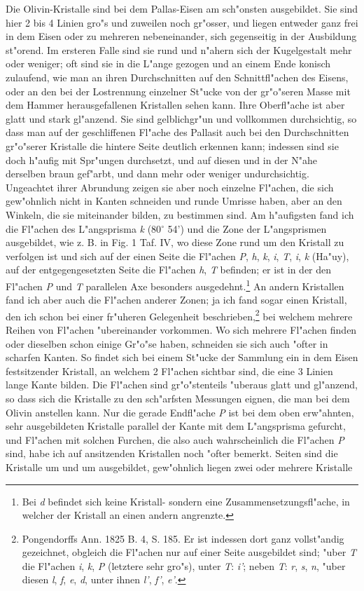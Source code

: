 \documentclass[a4paper, 11pt, oneside]{article}
\begin{document}
Die Olivin-Kristalle sind bei dem Pallas-Eisen am sch"onsten ausgebildet. Sie sind hier 2 bis 4 Linien gro"s und zuweilen noch gr"osser, und liegen entweder ganz frei in dem Eisen oder zu mehreren nebeneinander, sich gegenseitig in der Ausbildung st"orend. Im ersteren Falle sind sie rund und n"ahern sich der Kugelgestalt mehr oder weniger; oft sind sie in die L"ange gezogen und an einem Ende konisch zulaufend, wie man an ihren Durchschnitten auf den Schnittfl"achen des Eisens, oder an den bei der Lostrennung einzelner St"ucke von der gr"o"seren Masse mit dem Hammer herausgefallenen Kristallen sehen kann. Ihre Oberfl"ache ist aber glatt und stark gl"anzend. Sie sind gelblichgr"un und vollkommen durchsichtig, so dass man auf der geschliffenen Fl"ache des Pallasit auch bei den Durchschnitten gr"o"serer Kristalle die hintere Seite deutlich erkennen kann; indessen sind sie doch h"aufig mit Spr"ungen durchsetzt, und auf diesen und in der N"ahe derselben braun gef"arbt, und dann mehr oder weniger undurchsichtig. Ungeachtet ihrer Abrundung zeigen sie aber noch einzelne Fl"achen, die sich gew"ohnlich nicht in Kanten schneiden und runde Umrisse haben, aber an den Winkeln, die sie miteinander bilden, zu bestimmen sind. Am h"aufigsten fand ich die Fl"achen des L"angsprisma \emph{k} (80$^{\circ}$ 54’) und die Zone der L"angsprismen ausgebildet, wie z. B. in Fig. 1 Taf. IV, wo diese Zone rund um den Kristall zu verfolgen ist und sich auf der einen Seite die Fl"achen \emph{P}, \emph{h}, \emph{k}, \emph{i}, \emph{T}, \emph{i}, \emph{k} (Ha"uy), auf der entgegengesetzten Seite die Fl"achen \emph{h}, \emph{T} befinden; er ist in der den Fl"achen \emph{P} und \emph{T} parallelen Axe besonders ausgedehnt.\footnote{Bei \emph{d} befindet sich keine Kristall- sondern eine Zusammensetzungsfl"ache, in welcher der Kristall an einen andern angrenzte.} An andern Kristallen fand ich aber auch die Fl"achen anderer Zonen; ja ich fand sogar einen Kristall, den ich schon bei einer fr"uheren Gelegenheit beschrieben,\footnote{Pongendorffs Ann. 1825 B. 4, S. 185. Er ist indessen dort ganz vollst"andig gezeichnet, obgleich die Fl"achen nur auf einer Seite ausgebildet sind; "uber \emph{T} die Fl"achen \emph{i}, \emph{k}, \emph{P} (letztere sehr gro"s), unter \emph{T}: \emph{i'}; neben \emph{T}: \emph{r}, \emph{s}, \emph{n}, "uber diesen \emph{l}, \emph{f}, \emph{e}, \emph{d}, unter ihnen \emph{l'}, \emph{f'}, \emph{e'}.} bei welchem mehrere Reihen von Fl"achen "ubereinander vorkommen. Wo sich mehrere Fl"achen finden oder dieselben schon einige Gr"o"se haben, schneiden sie sich auch "ofter in scharfen Kanten. So findet sich bei einem St"ucke der Sammlung ein in dem Eisen festsitzender Kristall, an welchem 2 Fl"achen sichtbar sind, die eine 3 Linien lange Kante bilden. Die Fl"achen sind gr"o"stenteils "uberaus glatt und gl"anzend, so dass sich die Kristalle zu den sch"arfsten Messungen eignen, die man bei dem Olivin anstellen kann. Nur die gerade Endfl"ache \emph{P} ist bei dem oben erw"ahnten, sehr ausgebildeten Kristalle parallel der Kante mit dem L"angsprisma gefurcht, und Fl"achen mit solchen Furchen, die also auch wahrscheinlich die Fl"achen \emph{P} sind, habe ich auf ansitzenden Kristallen noch "ofter bemerkt. Seiten sind die Kristalle um und um ausgebildet, gew"ohnlich liegen zwei oder mehrere Kristalle 
\end{document}
